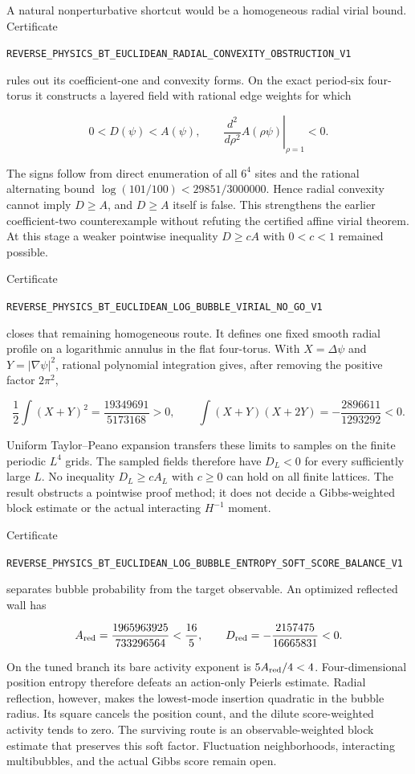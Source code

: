 \documentclass[11pt]{article}
\theoremstyle{definition}
\theoremstyle{remark}
\newcommand{\cert}[1]{\nolinkurl{#1}}
\begin{document}
A natural nonperturbative shortcut would be a homogeneous radial virial
bound.  Certificate

\cert{REVERSE_PHYSICS_BT_EUCLIDEAN_RADIAL_CONVEXITY_OBSTRUCTION_V1}

rules out its coefficient-one and convexity forms.  On the exact period-six
four-torus it constructs a layered field with rational edge weights for which

\[
 0<D(\psi)<A(\psi),\qquad
 \left.\frac{d^2}{d\rho^2}A(\rho\psi)\right|_{\rho=1}<0.
\]

The signs follow from direct enumeration of all \(6^4\) sites and the
rational alternating bound
\(\log(101/100)<29851/3000000\).  Hence radial convexity cannot imply
\(D\geq A\), and \(D\geq A\) itself is false.  This strengthens the earlier
coefficient-two counterexample without refuting the certified affine virial
theorem.  At this stage a weaker pointwise inequality \(D\geq cA\) with
\(0<c<1\) remained possible.

Certificate

\cert{REVERSE_PHYSICS_BT_EUCLIDEAN_LOG_BUBBLE_VIRIAL_NO_GO_V1}

closes that remaining homogeneous route.  It defines one fixed smooth radial
profile on a logarithmic annulus in the flat four-torus.  With
\(X=\Delta\psi\) and \(Y=|\nabla\psi|^2\), rational polynomial integration
gives, after removing the positive factor \(2\pi^2\),

\[
 \frac12\int(X+Y)^2=\frac{19349691}{5173168}>0,
 \qquad
 \int(X+Y)(X+2Y)=-\frac{2896611}{1293292}<0.
\]

Uniform Taylor--Peano expansion transfers these limits to samples on the
finite periodic \(L^4\) grids.  The sampled fields therefore have \(D_L<0\)
for every sufficiently large \(L\).  No inequality \(D_L\geq cA_L\) with
\(c\geq0\) can hold on all finite lattices.  The result obstructs a pointwise
proof method; it does not decide a Gibbs-weighted block estimate or the actual
interacting \(H^{-1}\) moment.

Certificate

\cert{REVERSE_PHYSICS_BT_EUCLIDEAN_LOG_BUBBLE_ENTROPY_SOFT_SCORE_BALANCE_V1}

separates bubble probability from the target observable.  An optimized
reflected wall has

\[
 A_{\rm red}=\frac{1965963925}{733296564}<\frac{16}{5},
 \qquad
 D_{\rm red}=-\frac{2157475}{16665831}<0.
\]

On the tuned branch its bare activity exponent is
\(5A_{\rm red}/4<4\).  Four-dimensional position entropy therefore defeats
an action-only Peierls estimate.  Radial reflection, however, makes the
lowest-mode insertion quadratic in the bubble radius.  Its square cancels
the position count, and the dilute score-weighted activity tends to zero.
The surviving route is an observable-weighted block estimate that preserves
this soft factor.  Fluctuation neighborhoods, interacting multibubbles, and
the actual Gibbs score remain open.
\end{document}
